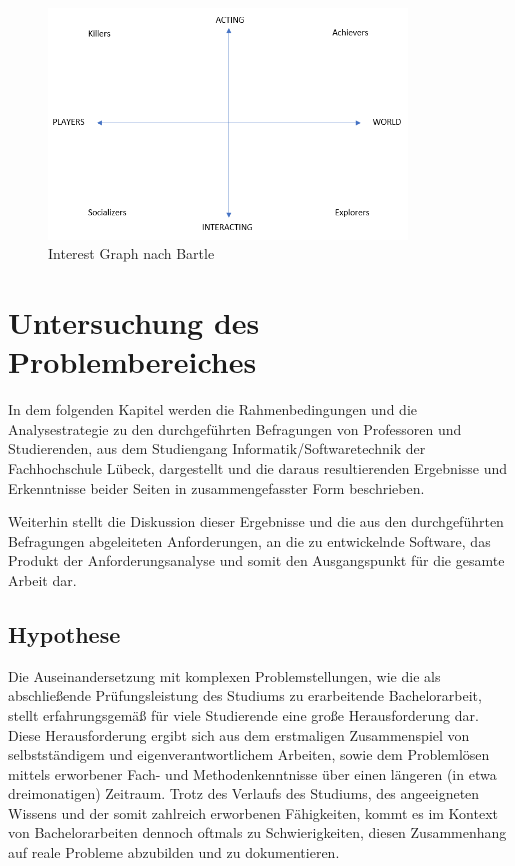 \documentclass[bibliography=totoc,listof=totoc,BCOR=5mm,DIV=12,oneside]{scrbook}
\begin{document}
\begin{figure}[H]
	\centering
	\includegraphics[width=0.85\textwidth, keepaspectratio]{Bilder/Diagramme/InterestGraphBartle.png}
	\caption{Interest Graph nach Bartle \cite{bartle1996hearts}}
	\label{img:interetGraphBartle}
\end{figure}

\bigskip
\chapter{Untersuchung des Problembereiches} \label{chap:problemanalyse}
\par In dem folgenden Kapitel werden die Rahmenbedingungen und die Analysestrategie zu den durchgeführten Befragungen von Professoren und Studierenden, aus dem Studiengang Informatik/Softwaretechnik der Fachhochschule Lübeck, dargestellt und die daraus resultierenden Ergebnisse und Erkenntnisse beider Seiten in zusammengefasster Form beschrieben. 
\par Weiterhin stellt die Diskussion dieser Ergebnisse und die aus den durchgeführten Befragungen abgeleiteten Anforderungen, an die zu entwickelnde Software, das Produkt der Anforderungsanalyse und somit den Ausgangspunkt für die gesamte Arbeit dar.

\section{Hypothese}
\par Die Auseinandersetzung mit komplexen Problemstellungen, wie die als abschließende Prüfungsleistung des Studiums zu erarbeitende Bachelorarbeit, stellt erfahrungsgemäß für viele Studierende eine große Herausforderung dar. Diese Herausforderung ergibt sich aus dem erstmaligen Zusammenspiel von selbstständigem und eigenverantwortlichem Arbeiten, sowie dem Problemlösen mittels erworbener Fach- und Methodenkenntnisse über einen längeren (in etwa dreimonatigen) Zeitraum.
Trotz des Verlaufs des Studiums, des angeeigneten Wissens und der somit zahlreich erworbenen Fähigkeiten, kommt es im Kontext von Bachelorarbeiten dennoch oftmals zu Schwierigkeiten, diesen Zusammenhang auf reale Probleme abzubilden und zu dokumentieren.
\end{document}
